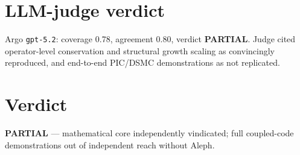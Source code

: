 \documentclass[11pt]{article}
\begin{document}
\section{LLM-judge verdict}
Argo \texttt{gpt-5.2}: coverage 0.78, agreement 0.80, verdict \textbf{PARTIAL}. Judge cited operator-level conservation and structural growth scaling as convincingly reproduced, and end-to-end PIC/DSMC demonstrations as not replicated.



\section*{Verdict}
\textbf{PARTIAL} --- mathematical core independently vindicated; full coupled-code demonstrations out of independent reach without Aleph.
\end{document}
